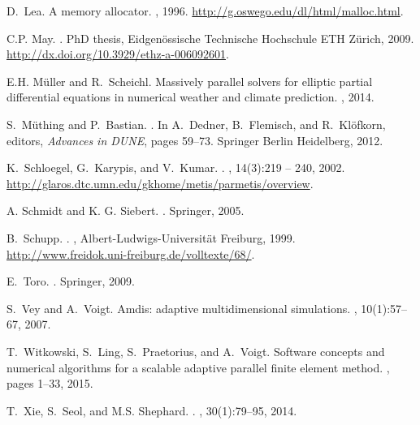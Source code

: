 \documentclass[10pt,notitlepage,a4paper]{article}
\begin{document}
\begin{thebibliography}{10}
D.~Lea.
\newblock A memory allocator.
, 1996.
\newblock \url{http://g.oswego.edu/dl/html/malloc.html}.

C.P. May.
.
\newblock PhD thesis, Eidgen{\"o}ssische Technische Hochschule ETH Z{\"u}rich,
  2009.
\newblock \url{http://dx.doi.org/10.3929/ethz-a-006092601}.

E.H. M{\"u}ller and R.~Scheichl.
\newblock Massively parallel solvers for elliptic partial differential
  equations in numerical weather and climate prediction.
, 2014.

S.~M{\"u}thing and P.~Bastian.
.
\newblock In A.~Dedner, B.~Flemisch, and R.~Kl{\"o}fkorn, editors, {\em
  Advances in DUNE}, pages 59--73. Springer Berlin Heidelberg, 2012.

K.~Schloegel, G.~Karypis, and V.~Kumar.
.
, 14(3):219
  -- 240, 2002.
\newblock \url{http://glaros.dtc.umn.edu/gkhome/metis/parmetis/overview}.

{A.} Schmidt and {K. G.} Siebert.
.
\newblock Springer, 2005.

B.~Schupp.
.
, Albert-Ludwigs-Universit\"at
  Freiburg, 1999.
\newblock \url{http://www.freidok.uni-freiburg.de/volltexte/68/}.

E.~Toro.
.
\newblock Springer, 2009.

S.~Vey and A.~Voigt.
\newblock Amdis: adaptive multidimensional simulations.
, 10(1):57--67, 2007.

T.~Witkowski, S.~Ling, S.~Praetorius, and A.~Voigt.
\newblock Software concepts and numerical algorithms for a scalable adaptive
  parallel finite element method.
, pages 1--33, 2015.

T.~Xie, S.~Seol, and M.S. Shephard.
.
, 30(1):79--95, 2014.

\end{thebibliography}
\end{document}
